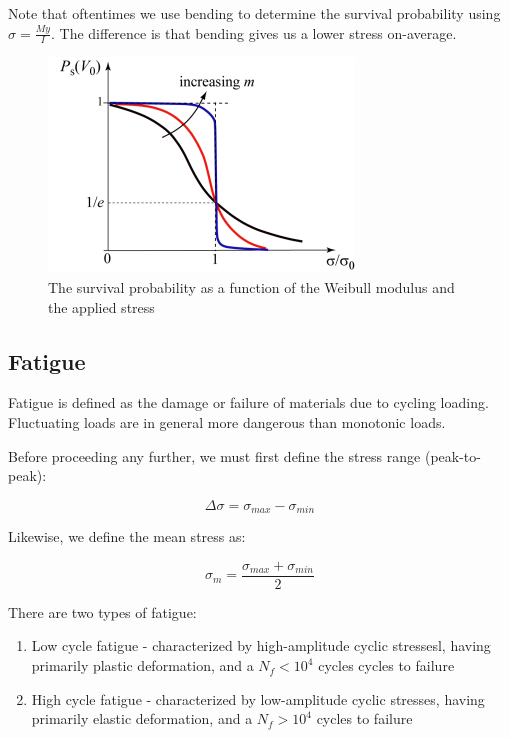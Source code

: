 \documentclass{article}
\begin{document}
Note that oftentimes we use bending to determine the survival probability using $\sigma = \frac{My}{I}$. The difference is that bending gives us a lower stress on-average.

\begin{figure}[h]
    \centering
    \includegraphics{images/survival.png}
    \caption{The survival probability as a function of the Weibull modulus and the applied stress}
    \label{fig:enter-label}
\end{figure}

\subsection{Fatigue}

\begin{definition}[Fatigue]
    Fatigue is defined as the damage or failure of materials due to cycling loading. Fluctuating loads are in general more dangerous than monotonic loads.
\end{definition}

Before proceeding any further, we must first define the stress range (peak-to-peak):

\[ \Delta\sigma = \sigma_{max} - \sigma_{min} \]

Likewise, we define the mean stress as:

\[ \sigma_m = \frac{\sigma_{max} + \sigma_{min}}{2} \]

There are two types of fatigue:

\begin{enumerate}
    \item Low cycle fatigue - characterized by high-amplitude cyclic stressesl, having primarily plastic deformation, and a $N_f < 10^4$ cycles cycles to failure
    \item High cycle fatigue - characterized by low-amplitude cyclic stresses, having primarily elastic deformation, and a $N_f > 10^4$ cycles to failure
\end{enumerate}
\end{document}
